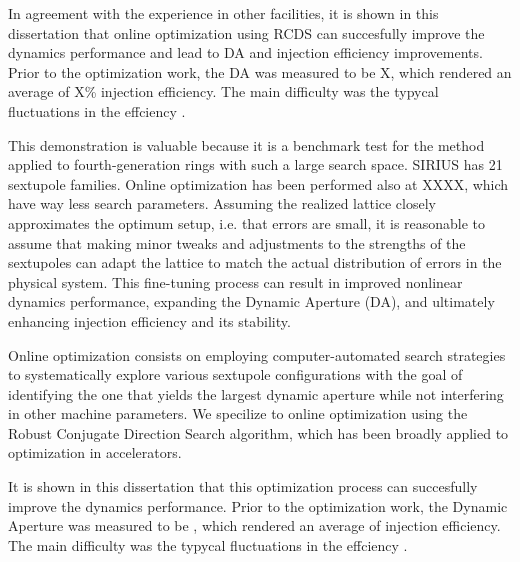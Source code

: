 In agreement with the experience in other facilities, it is shown in this dissertation that online optimization using RCDS can succesfully improve the dynamics performance and lead to DA and injection efficiency improvements. Prior to the optimization work, the DA was measured to be  X, which rendered an average of X\%  injection efficiency. The main difficulty was the typycal fluctuations in the effciency .

This demonstration is valuable because it is a benchmark test for the method applied to fourth-generation rings with such a large search space. SIRIUS has 21 sextupole families. Online optimization has been performed also at XXXX, which have way less search parameters.
Assuming the realized lattice closely approximates the optimum setup, i.e. that errors are small, it is reasonable to assume that making minor tweaks and adjustments to the strengths of the sextupoles can adapt the lattice to match the actual distribution of errors in the physical system. This fine-tuning process can result in improved nonlinear dynamics performance, expanding the Dynamic Aperture (DA), and ultimately enhancing injection efficiency and its stability.

Online optimization consists on employing computer-automated search strategies to systematically explore various sextupole configurations with the goal of identifying the one that yields the largest dynamic aperture while not interfering in other machine parameters. We specilize to online optimization using the Robust Conjugate Direction Search algorithm, which has been broadly applied to optimization in accelerators.

It is shown in this dissertation that this optimization process can succesfully improve the dynamics performance. Prior to the optimization work, the Dynamic Aperture was measured to be , which rendered an average of  injection efficiency. The main difficulty was the typycal fluctuations in the effciency .

